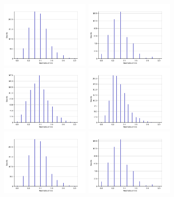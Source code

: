 \begin{figure}[!t]
\centering
\includegraphics[width=1.7in]{static/bullseye_hierarchical.png}
\includegraphics[width=1.7in]{static/spiral_hierarchical.png}
\includegraphics[width=1.7in]{static/interlocking_tori_hierarchical.png}
\includegraphics[width=1.7in]{static/skewer_hierarchical.png}
\includegraphics[width=1.7in]{static/bullseye_hierarchical.png}
\includegraphics[width=1.7in]{static/spiral_hierarchical.png}

\end{figure}
